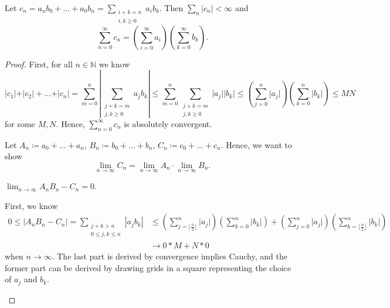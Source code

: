 \begin{theorem}
    Let \(c_n = a_n b_0 + \dots + a_0 b_n = \sum_{\substack{i + k = n \\ i,k \ge 0}} a_i b_k \). Then \(\sum_{n} \vert c_n \vert < \infty\) and
\[
    \sum_{n=0}^{\infty} c_n = \left( \sum_{i=0}^{\infty} a_i  \right) \left( \sum_{k=0}^{\infty} b_k  \right).  
\]  
\end{theorem}
\begin{proof}
    First, for all \(n \in \mathbb{N} \) we know
\[
    \vert c_1 \vert + \vert c_2 \vert + \dots + \vert c_n \vert = \sum_{m=0}^n \left\vert \sum_{\substack{j + k = m \\ j,k \ge 0}} a_j b_k    \right\vert \le \sum_{m=0}^n \sum_{\substack{j + k = m \\ j,k \ge 0}} \vert a_j \vert \vert b_k \vert \le \left( \sum_{j=0}^n \vert a_j \vert   \right) \left( \sum_{k=0}^n \vert b_k \vert   \right) \le MN
\] for some \(M, N\). Hence, \(\sum_{n=0}^{\infty} c_n \) is absolutely convergent.

Let \(A_n \coloneqq a_0 + \dots + a_n\), \(B_n \coloneqq b_0 + \dots + b_n\), \(C_n \coloneqq c_0 + \dots + c_n\). Hence, we want to show
\[
    \lim_{n \to \infty} C_n = \lim_{n \to \infty} A_n \cdot \lim_{n \to \infty} B_n. 
\]  
\begin{claim}
    \(\lim_{n \to \infty} A_n B_n - C_n = 0 \). 
\end{claim}  
\begin{explanation}
First, we know 
\begin{align*}
        0 \le \left\vert A_n B_n - C_n \right\vert  =  \sum_{\substack{j + k > n \\ 0 \le j,k \le n}} \left\vert a_j b_k \right\vert &\le \left( \sum_{j = \lfloor \frac{n}{2}  \rfloor}^n \vert a_j \vert  \right) \left( \sum_{k = 0}^n \vert b_k \vert  \right) + \left( \sum_{j = 0}^n \vert a_j \vert  \right) \left( \sum_{k = \lfloor \frac{n}{2} \rfloor}^n \vert b_k \vert  \right) \\ &\to 0 * M + N * 0
\end{align*}
when \(n \to \infty \). The last part is derived by convergence implies Cauchy, and the former part can be derived by drawing grids in a square representing the choice of \(a_j\) and \(b_k\).
\end{explanation}
\end{proof}

